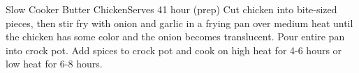 \begin{recipe}{Slow Cooker Butter Chicken}{Serves 4}{1 hour (prep)}
  Cut chicken into bite-sized pieces, then stir fry with onion and garlic in a
  frying pan over medium heat until the chicken has some color and the onion
  becomes translucent. Pour entire pan into crock pot.
  Add spices to crock pot and cook on high heat for 4-6 hours or low heat for
  6-8 hours.
\end{recipe}
